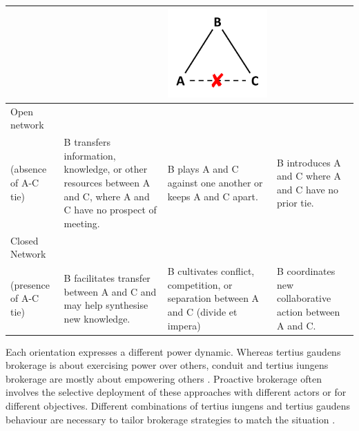 \begin{table}
{\begin{threeparttable}
\begin{tabular*}{\textwidth}{>{\raggedright}p{5cm}>{\raggedright\arraybackslash}p{6cm}>{\raggedright\arraybackslash}p{6cm}>{\raggedright\arraybackslash}p{6cm}}
&  & \begin{minipage}{0.2\textwidth} \centering \includegraphics[width=0.7\linewidth]{Images/TG_brokerage_2} \end{minipage}  & \\
\midrule
Open network\\(absence of A-C tie) & B transfers information, knowledge, or other resources between A and C, where A and C have no prospect of meeting. & B plays A and C against one another or keeps A and C apart. & B introduces A and C where A and C have no prior tie. \\
\midrule
Closed Network\\(presence of A-C tie) & B facilitates transfer between A and C and may help synthesise new knowledge. & B cultivates conflict, competition, or separation between A and C (divide et impera) & B coordinates new collaborative action between A and C.  \\ 
\bottomrule
\end{tabular*}
\end{threeparttable}
}
\end{table}

Each orientation expresses a different power dynamic. Whereas tertius gaudens brokerage is about exercising power over others, conduit and tertius iungens brokerage are mostly about empowering others \citep{fleming2007collaborative,obstfeld2014brokerage}. Proactive brokerage often involves the selective deployment of these approaches with different actors or for different objectives. Different combinations of tertius iungens and tertius gaudens behaviour are necessary to tailor brokerage strategies to match the situation \citep{lingo2010nexus,obstfeld2014brokerage,quintane2016brokers}. \medskip

